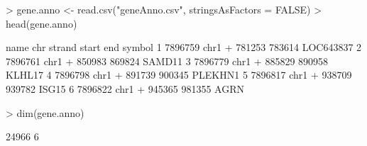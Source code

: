 \begin{Schunk}
\begin{Sinput}
> gene.anno <- read.csv("geneAnno.csv", stringsAsFactors = FALSE)
> head(gene.anno)
\end{Sinput}
\begin{Soutput}
     name  chr strand  start    end    symbol
1 7896759 chr1      + 781253 783614 LOC643837
2 7896761 chr1      + 850983 869824    SAMD11
3 7896779 chr1      + 885829 890958    KLHL17
4 7896798 chr1      + 891739 900345   PLEKHN1
5 7896817 chr1      + 938709 939782     ISG15
6 7896822 chr1      + 945365 981355      AGRN
\end{Soutput}
\begin{Sinput}
> dim(gene.anno)
\end{Sinput}
\begin{Soutput}
[1] 24966     6
\end{Soutput}
\end{Schunk}
